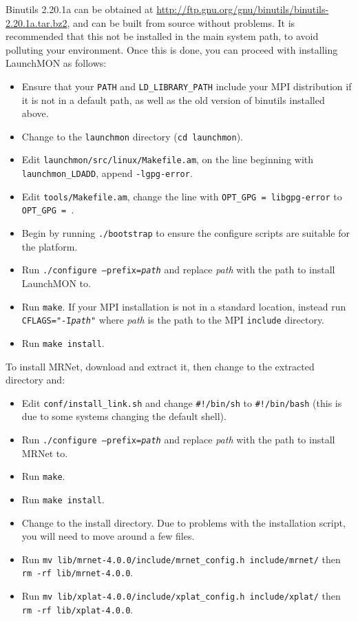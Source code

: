 \documentclass{refart}
\begin{document}
Binutils 2.20.1a can be obtained at \url{http://ftp.gnu.org/gnu/binutils/binutils-2.20.1a.tar.bz2}, and can be built from source without problems. It is recommended that this not be installed in the main system path, to avoid polluting your environment. Once this is done, you can proceed with installing LaunchMON as follows:

\begin{itemize}
\item Ensure that your \texttt{PATH} and \texttt{LD\_LIBRARY\_PATH} include your MPI distribution if it is not in a default path, as well as the old version of binutils installed above.
\item Change to the \texttt{launchmon} directory (\texttt{cd launchmon}).
\item Edit \texttt{launchmon/src/linux/Makefile.am}, on the line beginning with \texttt{launchmon\_LDADD}, append \texttt{-lgpg-error}.
\item Edit \texttt{tools/Makefile.am}, change the line with \texttt{OPT\_GPG = libgpg-error} to \texttt{OPT\_GPG = }.
\item Begin by running \texttt{./bootstrap} to ensure the configure scripts are suitable for the platform.
\item Run \texttt{./configure --prefix=\emph{path}} and replace \emph{path} with the path to install LaunchMON to.
\item Run \texttt{make}. If your MPI installation is not in a standard location, instead run \texttt{CFLAGS="-I\emph{path}"} where \emph{path} is the path to the MPI \texttt{include} directory.
\item Run \texttt{make install}.
\end{itemize}

To install MRNet, download and extract it, then change to the extracted directory and:

\begin{itemize}
\item Edit \texttt{conf/install\_link.sh} and change \texttt{\#!/bin/sh} to \texttt{\#!/bin/bash} (this is due to some systems changing the default shell).
\item Run \texttt{./configure --prefix=\emph{path}} and replace \emph{path} with the path to install MRNet to.
\item Run \texttt{make}.
\item Run \texttt{make install}.
\item Change to the install directory. Due to problems with the installation script, you will need to move around a few files.
\item Run \texttt{mv lib/mrnet-4.0.0/include/mrnet\_config.h include/mrnet/} then \texttt{rm -rf lib/mrnet-4.0.0}.
\item Run \texttt{mv lib/xplat-4.0.0/include/xplat\_config.h include/xplat/} then \texttt{rm -rf lib/xplat-4.0.0}.
\end{itemize}
\end{document}
